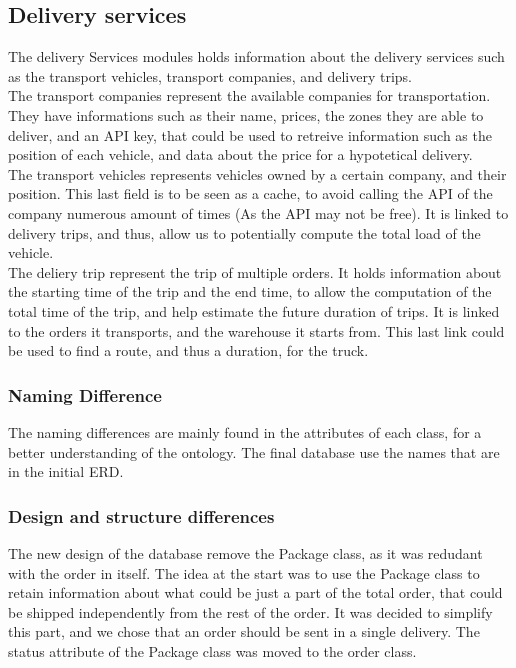 \documentclass{article}
\begin{document}
\subsection{Delivery services}
The delivery Services modules holds information about the delivery services such as the transport vehicles, transport companies, and delivery trips. \\

The transport companies represent the available companies for transportation. They have informations such as their name, prices, the zones they are able to deliver, and an API key, that could be used to retreive information such as the position of each vehicle, and data about the price for a hypotetical delivery. \\

The transport vehicles represents vehicles owned by a certain company, and their position. This last field is to be seen as a cache, to avoid calling the API of the company numerous amount of times (As the API may not be free). It is linked to delivery trips, and thus, allow us to potentially compute the total load of the vehicle. \\

The deliery trip represent the trip of multiple orders. It holds information about the starting time of the trip and the end time, to allow the computation of the total time of the trip, and help estimate the future duration of trips. It is linked to the orders it transports, and the warehouse it starts from. This last link could be used to find a route, and thus a duration, for the truck. \\

\subsubsection{Naming Difference}
The naming differences are mainly found in the attributes of each class, for a better understanding of
the ontology. The final database use the names that are in the initial ERD.

\subsubsection{Design and structure differences}
The new design of the database remove the Package class, as it was redudant with the order in itself. The idea at the start was to use the Package class to retain information about what could be just a part of the total order, that could be shipped independently from the rest of the order. It was decided to simplify this part, and we chose that an order should be sent in a single delivery. The status attribute of the Package class was moved to the order class.
\end{document}
